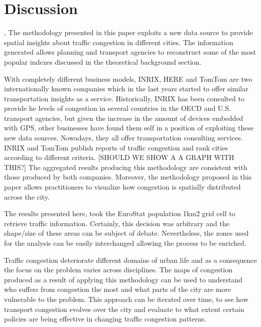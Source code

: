 \documentclass[a4paper]{jpconf}
\begin{document}
\section{Discussion}, %
\indent The methodology presented in this paper exploits a new data source to provide spatial insights about traffic congestion in different cities. The information generated allows planning and transport agencies to reconstruct some of the most popular indexes discussed in the theoretical background section.\par

\indent With completely different business models, INRIX, HERE and TomTom are two internationally known companies which in the last years started to offer similar transportation insights as a service. Historically, INRIX has been consulted to provide he levels of congestion in several countries in the OECD and U.S. transport agencies, but given the increase in the amount of devices embedded with GPS, other businesses have found them self in a position of exploiting these new data sources. Nowadays, they all offer transportation consulting services. INRIX and TomTom publish reports of traffic congestion and rank cities according to different criteria. [SHOULD WE SHOW A A GRAPH WITH THIS?] The aggregated results producing this methodology are consistent with those produced by both companies. Moreover, the methodology proposed in this paper allows practitioners to visualize how congestion is spatially distributed across the city.\par

\indent The results presented here, took the EuroStat population 1km2 grid cell to retrieve traffic information. Certainly, this decision was arbitrary and the shape/size of these areas can be subject of debate. Nevertheless, the zones used for the analysis can be easily interchanged allowing the process to be enriched.\par

\indent Traffic congestion deteriorate different domains of urban life and as a consequence the focus on the problem varies across disciplines. The maps of congestion produced as a result of applying this methodology can be used to understand who suffers from congestion the most and what parts of the city are more vulnerable to the problem. This approach can be iterated over time, to see how transport congestion evolves over the city and evaluate to what extent certain policies are being effective in changing traffic congestion patterns.\par
\end{document}
